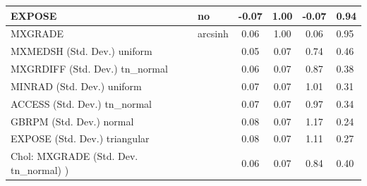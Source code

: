 \begin{table}
\begin{center}
\begin{tabular}{|l|l|c|c|c|l|}
			\hline
			EXPOSE & no & -0.07 & 1.00 & -0.07 & 0.94 \\
			\hline
			MXGRADE & arcsinh & 0.06 & 1.00 & 0.06 & 0.95 \\
			\hline
			MXMEDSH (Std. Dev.) uniform &  & 0.05 & 0.07 & 0.74 & 0.46 \\
			\hline
			MXGRDIFF (Std. Dev.) tn_normal &  & 0.06 & 0.07 & 0.87 & 0.38 \\
			\hline
			MINRAD (Std. Dev.) uniform &  & 0.07 & 0.07 & 1.01 & 0.31 \\
			\hline
			ACCESS (Std. Dev.) tn_normal &  & 0.07 & 0.07 & 0.97 & 0.34 \\
			\hline
			GBRPM (Std. Dev.) normal &  & 0.08 & 0.07 & 1.17 & 0.24 \\
			\hline
			EXPOSE (Std. Dev.) triangular &  & 0.08 & 0.07 & 1.11 & 0.27 \\
			\hline
			 Chol: MXGRADE (Std. Dev. tn_normal) ) &  & 0.06 & 0.07 & 0.84 & 0.40 \\
			\hline
		\end{tabular}
	\end{center}
\end{table}